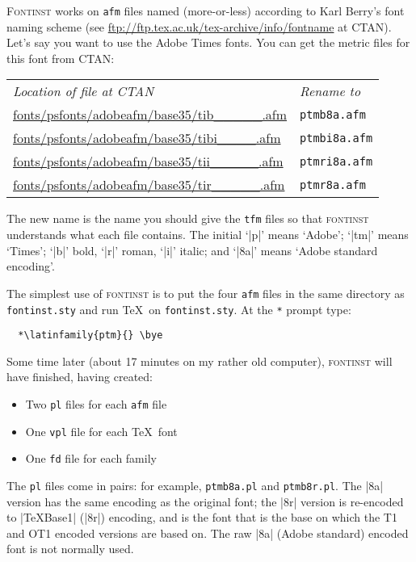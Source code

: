 \documentclass[a4paper]{ltxguide}
\newcommand*{\setfilename}[1]{\texttt{#1}}
\newcommand*{\setpackagename}[1]{\textsc{#1}}
\newcommand{\fontinst}{\setpackagename{font\-inst}\xspace}
\newcommand{\Fontinst}{\setpackagename{Font\-inst}\xspace}
\newcommand{\pl} {\setfilename{pl}\xspace}
\newcommand{\fd} {\setfilename{fd}\xspace}
\newcommand{\afm}{\setfilename{afm}\xspace}
\newcommand{\vpl}{\setfilename{vpl}\xspace}
\newcommand{\tfm}{\setfilename{tfm}\xspace}
\begin{document}
\Fontinst works on \afm files named (more-or-less) according to
Karl Berry's font naming scheme (see
\url{ftp://ftp.tex.ac.uk/tex-archive/info/fontname} at CTAN).
Let's say you want to use the Adobe Times fonts.  You can get the
metric files for this font from CTAN:
\begin{center}
\begin{small}
\begin{tabular}{ll}
  \emph{Location of file at CTAN} & \emph{Rename to} \\
  \url{fonts/psfonts/adobeafm/base35/tib_____.afm} &
  \texttt{ptmb8a.afm} \\
  \url{fonts/psfonts/adobeafm/base35/tibi____.afm} &
  \texttt{ptmbi8a.afm} \\
  \url{fonts/psfonts/adobeafm/base35/tii_____.afm} &
  \texttt{ptmri8a.afm} \\
  \url{fonts/psfonts/adobeafm/base35/tir_____.afm} &
  \texttt{ptmr8a.afm}
\end{tabular}
\end{small}
\end{center}
The new name is the name you should give the \tfm files so that
\fontinst understands what each file contains.  The initial `|p|'
means `Adobe'; `|tm|' means `Times'; `|b|' bold, `|r|' roman,
`|i|' italic; and `|8a|' means `Adobe standard encoding'.

The simplest use of \fontinst is to put the four \afm files in the
same directory as \texttt{fontinst.sty} and run \TeX\ on
\texttt{fontinst.sty}.  At the \verb|*| prompt type:
\begin{verbatim}
  *\latinfamily{ptm}{} \bye
\end{verbatim}

Some time later (about 17 minutes on my rather old computer),
\fontinst will have finished, having created:
\begin{itemize}
\item Two \pl files for each \afm file
\item One \vpl file for each \TeX\ font
\item One \fd file for each family
\end{itemize}
The \pl files come in pairs: for example, \texttt{ptmb8a.pl} and
\texttt{ptmb8r.pl}.  The |8a| version has the same encoding as the
original font; the |8r| version is re-encoded to |TeXBase1| (|8r|)
encoding, and is the font that is the base on which the T1 and OT1
encoded versions are based on.  The raw |8a| (Adobe standard)
encoded font is not normally used.
\end{document}
